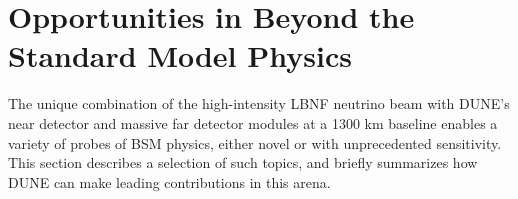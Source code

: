 \section{Opportunities in Beyond the Standard Model Physics}
\label{sec:exec-summ-physics-bsm}
The unique combination of the high-intensity LBNF neutrino beam with DUNE's near detector and massive \lartpc far detector modules at a 1300 km baseline enables a variety of probes of BSM physics, either novel or with unprecedented sensitivity. This section describes a selection of such topics, and briefly summarizes how DUNE can make leading contributions in this arena.

